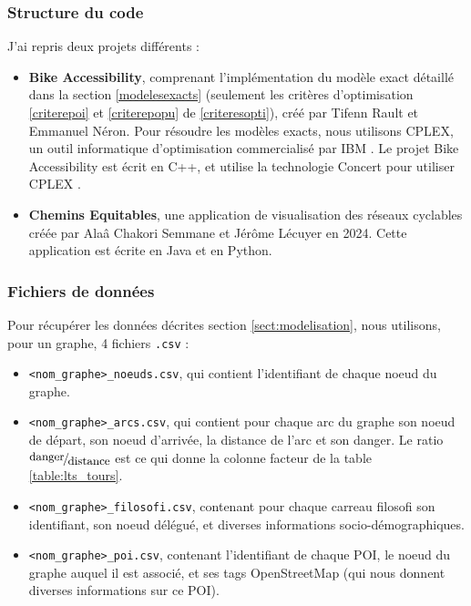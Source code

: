 \subsubsection{Structure du code}

J'ai repris deux projets différents :

\begin{itemize}
    \item \textbf{Bike Accessibility}, comprenant l'implémentation du modèle exact détaillé dans la section \ref{modelesexacts} (seulement les critères d'optimisation \ref{criterepoi} et \ref{criterepopu} de \ref{criteresopti}), créé par Tifenn Rault et Emmanuel Néron. Pour résoudre les modèles exacts, nous utilisons CPLEX, un outil informatique d'optimisation commercialisé par IBM \cite{cplex}. Le projet Bike Accessibility est écrit en C++, et utilise la technologie Concert pour utiliser CPLEX \cite{concert}.

    \item \textbf{Chemins Equitables}, une application de visualisation des réseaux cyclables créée par Alaâ Chakori Semmane et Jérôme Lécuyer en 2024. Cette application est écrite en Java et en Python.
\end{itemize}

\subsubsection{Fichiers de données}\label{sect:fichiersdonnees}

Pour récupérer les données décrites section \ref{sect:modelisation}, nous utilisons, pour un graphe, 4 fichiers \verb|.csv| :

\begin{itemize}
    \item \verb|<nom_graphe>_noeuds.csv|, qui contient l'identifiant de chaque noeud du graphe.
    \item \verb|<nom_graphe>_arcs.csv|, qui contient pour chaque arc du graphe son noeud de départ, son noeud d'arrivée, la distance de l'arc et son danger. Le ratio $\fFrac{\text{danger}}{\text{distance}}$ est ce qui donne la colonne facteur de la table \ref{table:lts_tours}.
    \item \verb|<nom_graphe>_filosofi.csv|, contenant pour chaque carreau filosofi son identifiant, son noeud délégué, et diverses informations socio-démographiques.
    \item \verb|<nom_graphe>_poi.csv|, contenant l'identifiant de chaque POI, le noeud du graphe auquel il est associé, et ses tags OpenStreetMap (qui nous donnent diverses informations sur ce POI). 
\end{itemize}

